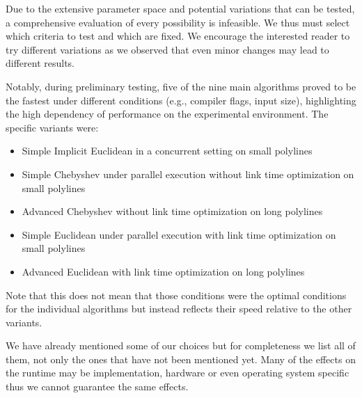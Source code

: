 Due to the extensive parameter space and potential variations that can be tested, a comprehensive evaluation of every possibility is infeasible. We thus must select which criteria to test and which are fixed. We encourage the interested reader to try different variations as we observed that even minor changes may lead to different results. 

Notably, during preliminary testing, five of the nine main algorithms proved to be the fastest under different conditions (e.g., compiler flags, input size), highlighting the high dependency of performance on the experimental environment. The specific variants were:
\begin{itemize}
	\item Simple Implicit Euclidean in a concurrent setting on small polylines 
	\item Simple Chebyshev under parallel execution without link time optimization on small polylines 
	\item Advanced Chebyshev without link time optimization on long polylines 
	\item Simple Euclidean under parallel execution with link time optimization on small polylines 
	\item Advanced Euclidean with link time optimization on long polylines 
\end{itemize}
Note that this does not mean that those conditions were the optimal conditions for the individual algorithms but instead reflects their speed relative to the other variants.

We have already mentioned some of our choices but for completeness we list all of them, not only the ones that have not been mentioned yet. Many of the effects on the runtime may be implementation, hardware or even operating system specific thus we cannot guarantee the same effects. 

